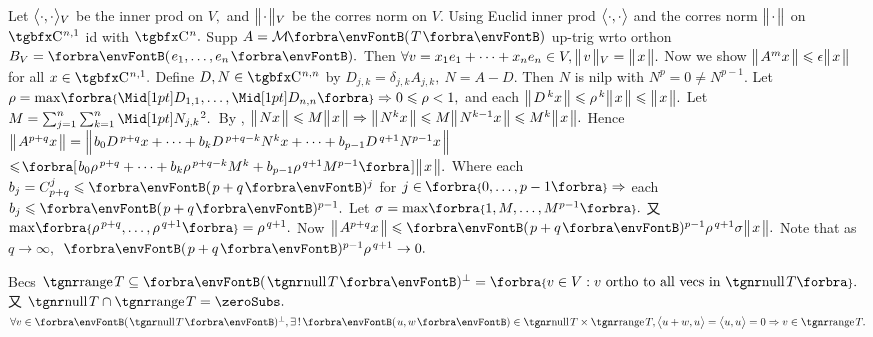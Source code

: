 Let $\big\langle{}\cdot,\cdot{}\big\rangle{_V}$ be the inner prod on $V,$ and $\big\Vert\hspace{1pt}{}{\cdot}{}\hspace{1pt}\big\Vert{_V}$ be the corres norm on $V.$\parSol{}
Using Euclid inner prod $\big\langle{}\cdot,\cdot{}\big\rangle$ and the corres norm $\big\Vert\hspace{1pt}{}{\cdot}{}\hspace{1pt}\big\Vert$ on $\CbbP{n,1}$ id with $\CbbP{n}.$\parSol{}
Supp $A=\Mt{T}$ up-trig wrto orthon $B_V=\Par{e_1,\dots,e_n}.$\parSol{}
Then $\forall v=x_1e_1+\dots+x_ne_n\in V,\big\Vert\hspace{1pt}{}v{}\hspace{1pt}\big\Vert{_V}=\big\Vert\hspace{1pt}{}x{}\hspace{1pt}\big\Vert.$ Now we show $\big\Vert\hspace{1pt}{}A^mx{}\hspace{1pt}\big\Vert\leqslant\epsilon\big\Vert\hspace{1pt}{}x{}\hspace{1pt}\big\Vert$ for all $x\in\CbbP{n,1}.$\parSol{}
Define $D,N\in\CbbP{n,n}$ by $D_{j,k}=\delta_{j,k}A_{j,k},\:N=A-D.$ Then $N$ is nilp with $N^p=0\neq N^{p-1}.$\parSol{}
Let $\rho=\max\!\Bra{\aMid{D_{1,1}},\dots,\aMid{D_{n,n}}}\Rightarrow0\leqslant\rho<1,$ and each $\big\Vert\hspace{1pt}{}D^{\,k}x{}\hspace{1pt}\big\Vert\leqslant\rho^{\,k}\big\Vert\hspace{1pt}{}x{}\hspace{1pt}\big\Vert\leqslant\big\Vert\hspace{1pt}{}x{}\hspace{1pt}\big\Vert.$\vspace{3pt}\parSol{}
Let $M=\sum_{j=1}^n\sum_{k=1}^n\aMidsq{N_{j,k}}.$ \,{By }, $\big\Vert\hspace{1pt}{}Nx{}\hspace{1pt}\big\Vert\leqslant M\big\Vert\hspace{1pt}{}x{}\hspace{1pt}\big\Vert\Rightarrow\big\Vert\hspace{1pt}{}N^{k}x{}\hspace{1pt}\big\Vert\leqslant M\big\Vert\hspace{1pt}{}N^{k-1}x{}\hspace{1pt}\big\Vert\leqslant M^k\big\Vert\hspace{1pt}{}x{}\hspace{1pt}\big\Vert.$\vspace{5pt}\parSol{}
Hence $\big\Vert\hspace{1pt}{}A^{p+q}x{}\hspace{1pt}\big\Vert=\Big\Vert\hspace{1pt}{}b_0D^{\,p+q}x+\dots+b_kD^{\,p+q-k}N^{k}x+\dots+b_{p-1}D^{\,q+1}N^{p-1}x{}\hspace{1pt}\Big\Vert$\vspace{3pt}\parSol{}
$\leqslant\!\BigSbra{{b_0\rho^{\,p+q}+\dots+b_k\rho^{\,p+q-k}M^k+b_{p-1}\rho^{\,q+1}M^{p-1}}}\Dvert{x}.$\vspace{4pt}\parSol{}
Where each $b_j=\mathC_{p+q}^j\leqslant\Par{p+q}{^j}$ for $j\in\;\!\!\Bra{0,\dots,p-1}\Rightarrow$ each $b_j\leqslant\Par{p+q}{^{p-1}}.$\vspace{1pt}\parSol{}
Let $\sigma=\max\!\Bra{1,M,\dots,M^{p-1}}.$ 又 $\max\!\Bra{\rho^{\,p+q},\dots,\rho^{\,q+1}}=\rho^{\,q+1}.$\parSol{}
Now $\Dvert{A^{p+q}x}\leqslant\Par{p+q}{^{p-1}}\rho^{\,q+1}\sigma\Dvert{x}.$ \;Note that as $q\rightarrow\infty,$ \,$\Par{p+q}{^{p-1}}\rho^{\,q+1}\rightarrow0.$\PfEnd
\SepLine
\ChEnd


\vspace{4pt}

Becs $\range T\subseteq\Par{\null T}{^\perp}=\Bra{v\in V:v\text{ ortho to all vecs in }\null T}.$ 又 $\null T\cap\range T=\zeroSubs.$\PfEnd\parSol{}
\Or $\forall v\in\Par{\null T}{^\perp},\exists\,!\,\Par{u,w}\in\null T\times\range T,\Ang{u+w,u}=\Ang{u,u}=0\Rightarrow v\in\range T.$\PfEnd
\SepLine

